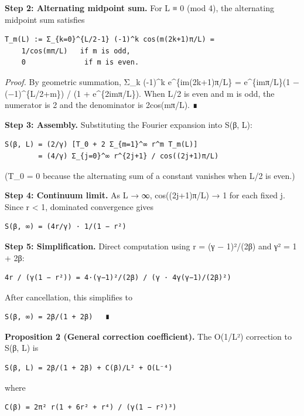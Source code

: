\documentclass[
  11pt,
]{article}
\begin{document}
\textbf{Step 2: Alternating midpoint sum.} For L ≡ 0 (mod 4), the alternating
midpoint sum satisfies

\begin{verbatim}
T_m(L) := Σ_{k=0}^{L/2-1} (-1)^k cos(m(2k+1)π/L) =
    1/cos(mπ/L)   if m is odd,
    0              if m is even.
\end{verbatim}

\emph{Proof.} By geometric summation, Σ\_k (-1)\^{}k e\^{}\{im(2k+1)π/L\} =
e\^{}\{imπ/L\}(1 − (−1)\^{}\{L/2+m\}) / (1 + e\^{}\{2imπ/L\}). When L/2 is even
and m is odd, the numerator is 2 and the denominator is 2cos(mπ/L). ∎

\textbf{Step 3: Assembly.} Substituting the Fourier expansion into S(β, L):

\begin{verbatim}
S(β, L) = (2/γ) [T_0 + 2 Σ_{m=1}^∞ r^m T_m(L)]
        = (4/γ) Σ_{j=0}^∞ r^{2j+1} / cos((2j+1)π/L)
\end{verbatim}

(T\_0 = 0 because the alternating sum of a constant vanishes when L/2 is even.)

\textbf{Step 4: Continuum limit.} As L → ∞, cos((2j+1)π/L) → 1 for each fixed j.
Since \textbar r\textbar{} \textless{} 1, dominated convergence gives

\begin{verbatim}
S(β, ∞) = (4r/γ) · 1/(1 − r²)
\end{verbatim}

\textbf{Step 5: Simplification.} Direct computation using r = (γ − 1)²/(2β) and
γ² = 1 + 2β:

\begin{verbatim}
4r / (γ(1 − r²)) = 4·(γ−1)²/(2β) / (γ · 4γ(γ−1)/(2β)²)
\end{verbatim}

After cancellation, this simplifies to

\begin{verbatim}
S(β, ∞) = 2β/(1 + 2β)   ∎
\end{verbatim}

\textbf{Proposition 2 (General correction coefficient).} The O(1/L²) correction
to S(β, L) is

\begin{verbatim}
S(β, L) = 2β/(1 + 2β) + C(β)/L² + O(L⁻⁴)
\end{verbatim}

where

\begin{verbatim}
C(β) = 2π² r(1 + 6r² + r⁴) / (γ(1 − r²)³)
\end{verbatim}
\end{document}
